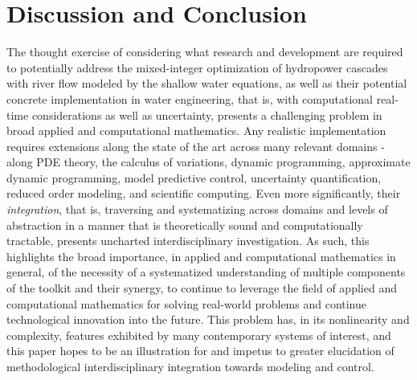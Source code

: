 \documentclass{article}
\newcommand{\1}{\mathds{1}}          %
\theoremstyle{definition}
\begin{document}
\begin{sloppypar}
\section{Discussion and Conclusion}

The thought exercise of considering what research and development are required to potentially address the mixed-integer optimization of hydropower cascades with river flow modeled by the shallow water equations, as well as their potential concrete implementation in water engineering, that is, with computational real-time considerations as well as uncertainty, presents a challenging problem in broad applied and computational mathematics. Any realistic implementation requires extensions along the state of the art across many relevant domains - along PDE theory, the calculus of variations, dynamic programming, approximate dynamic programming, model predictive control, uncertainty quantification, reduced order modeling, and scientific computing. Even more significantly, their \emph{integration}, that is, traversing and systematizing across domains and levels of abstraction in a manner that is theoretically sound and computationally tractable, presents uncharted interdisciplinary investigation. As such, this highlights the broad importance, in applied and computational mathematics in general, of the necessity of a systematized understanding of multiple components of the toolkit and their synergy, to continue to leverage the field of applied and computational mathematics for solving real-world problems and continue technological innovation into the future. This problem has, in its nonlinearity and complexity, features exhibited by many contemporary systems of interest, and this paper hopes to be an illustration for and impetus to greater elucidation of methodological interdisciplinary integration towards modeling and control.







\end{sloppypar}
\end{document}
